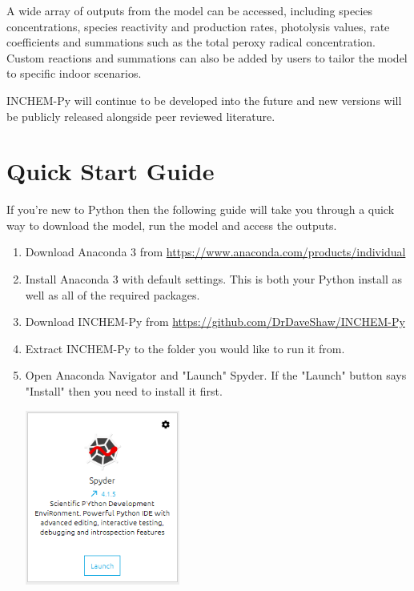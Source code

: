 \documentclass[a4paper]{refart}
\begin{document}
A wide array of outputs from the model can be accessed, including species concentrations, species reactivity and production rates, photolysis values, rate coefficients and summations such as the total peroxy radical concentration. Custom reactions and summations can also be added by users to tailor the model to specific indoor scenarios.

INCHEM-Py will continue to be developed into the future and new versions will be publicly released alongside peer reviewed literature. 

\section{Quick Start Guide}\label{Quick start}
\vspace{0.2cm}
{\hspace*{-\leftmarginwidth}
\begin{minipage}{\fullwidth}
If you're new to Python then the following guide will take you through a quick way to download the model, run the model and access the outputs.
\linespread{2.0}\selectfont
\begin{enumerate}
    \item Download Anaconda 3 from \url{https://www.anaconda.com/products/individual}
    \item Install Anaconda 3 with default settings. This is both your Python install as well as all of the required packages.
    \item Download INCHEM-Py from \url{https://github.com/DrDaveShaw/INCHEM-Py}
    \item Extract INCHEM-Py to the folder you would like to run it from.
    \item Open Anaconda Navigator and "Launch" Spyder. If the "Launch" button says "Install" then you need to install it first.
            
            \vspace{1em}
            \begin{minipage}[t]{\linewidth}
                \centering
                \includegraphics[width = 0.4\textwidth]{Spyder.png}
            \end{minipage}
            

\end{enumerate}
\end{minipage}}
\end{document}
